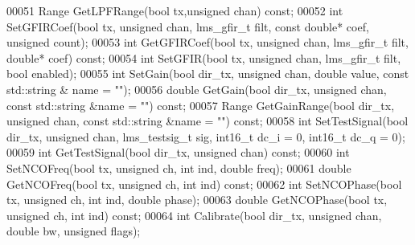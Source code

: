 \begin{DoxyCode}
00051     Range GetLPFRange(\textcolor{keywordtype}{bool} tx,\textcolor{keywordtype}{unsigned} chan) \textcolor{keyword}{const};
00052     \textcolor{keywordtype}{int} SetGFIRCoef(\textcolor{keywordtype}{bool} tx, \textcolor{keywordtype}{unsigned} chan, lms_gfir_t filt, \textcolor{keyword}{const} \textcolor{keywordtype}{double}* coef, \textcolor{keywordtype}{unsigned} 
      count);
00053     \textcolor{keywordtype}{int} GetGFIRCoef(\textcolor{keywordtype}{bool} tx, \textcolor{keywordtype}{unsigned} chan, lms_gfir_t filt, \textcolor{keywordtype}{double}* coef) \textcolor{keyword}{const};
00054     \textcolor{keywordtype}{int} SetGFIR(\textcolor{keywordtype}{bool} tx, \textcolor{keywordtype}{unsigned} chan, lms_gfir_t filt, \textcolor{keywordtype}{bool} enabled);
00055     \textcolor{keywordtype}{int} SetGain(\textcolor{keywordtype}{bool} dir_tx, \textcolor{keywordtype}{unsigned} chan, \textcolor{keywordtype}{double} value, \textcolor{keyword}{const} std::string &
      name = \textcolor{stringliteral}{""});
00056     \textcolor{keywordtype}{double} GetGain(\textcolor{keywordtype}{bool} dir_tx, \textcolor{keywordtype}{unsigned} chan, \textcolor{keyword}{const} std::string &name = \textcolor{stringliteral}{""}) \textcolor{keyword}{const};
00057     Range GetGainRange(\textcolor{keywordtype}{bool} dir_tx, \textcolor{keywordtype}{unsigned} chan, \textcolor{keyword}{const} std::string &name = \textcolor{stringliteral}{""}) \textcolor{keyword}{const};
00058     \textcolor{keywordtype}{int} SetTestSignal(\textcolor{keywordtype}{bool} dir_tx, \textcolor{keywordtype}{unsigned} chan, lms_testsig_t sig, int16\_t 
      dc_i = 0, int16\_t dc_q = 0);
00059     \textcolor{keywordtype}{int} GetTestSignal(\textcolor{keywordtype}{bool} dir_tx, \textcolor{keywordtype}{unsigned} chan) \textcolor{keyword}{const};
00060     \textcolor{keywordtype}{int} SetNCOFreq(\textcolor{keywordtype}{bool} tx, \textcolor{keywordtype}{unsigned} ch, \textcolor{keywordtype}{int} ind, \textcolor{keywordtype}{double} freq);
00061     \textcolor{keywordtype}{double} GetNCOFreq(\textcolor{keywordtype}{bool} tx, \textcolor{keywordtype}{unsigned} ch, \textcolor{keywordtype}{int} ind) \textcolor{keyword}{const};
00062     \textcolor{keywordtype}{int} SetNCOPhase(\textcolor{keywordtype}{bool} tx, \textcolor{keywordtype}{unsigned} ch, \textcolor{keywordtype}{int} ind, \textcolor{keywordtype}{double} phase);
00063     \textcolor{keywordtype}{double} GetNCOPhase(\textcolor{keywordtype}{bool} tx, \textcolor{keywordtype}{unsigned} ch, \textcolor{keywordtype}{int} ind) \textcolor{keyword}{const};
00064     \textcolor{keywordtype}{int} Calibrate(\textcolor{keywordtype}{bool} dir_tx, \textcolor{keywordtype}{unsigned} chan, \textcolor{keywordtype}{double} bw, \textcolor{keywordtype}{unsigned} flags);

\end{DoxyCode}

